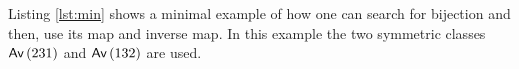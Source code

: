 \label{ch:minex}
Listing \ref{lst:min} shows a minimal example of how one can search for bijection and then, use its map and inverse map. In this example the two symmetric classes $\textsf{Av}\left(231\right)$ and $\textsf{Av}\left(132\right)$ are used.

